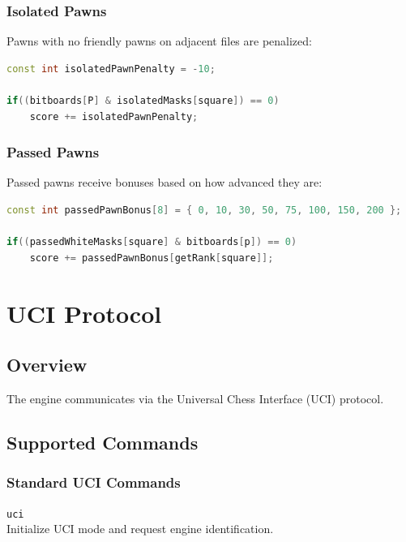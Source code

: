 \documentclass[11pt,a4paper]{report}
\newcommand{\apiendpoint}[3]{%
    \noindent\fbox{\texttt{#1}} \texttt{#2}\\
    #3\vspace{0.5em}
}
\begin{document}
\subsection{Isolated Pawns}

Pawns with no friendly pawns on adjacent files are penalized:

\begin{lstlisting}[language=C++]
const int isolatedPawnPenalty = -10;

if((bitboards[P] & isolatedMasks[square]) == 0) 
    score += isolatedPawnPenalty;
\end{lstlisting}

\subsection{Passed Pawns}

Passed pawns receive bonuses based on how advanced they are:

\begin{lstlisting}[language=C++]
const int passedPawnBonus[8] = { 0, 10, 30, 50, 75, 100, 150, 200 };

if((passedWhiteMasks[square] & bitboards[p]) == 0) 
    score += passedPawnBonus[getRank[square]];
\end{lstlisting}

\chapter{UCI Protocol}

\section{Overview}

The engine communicates via the Universal Chess Interface (UCI) protocol.

\section{Supported Commands}

\subsection{Standard UCI Commands}

\apiendpoint{IN}{uci}{Initialize UCI mode and request engine identification.}
\end{document}
